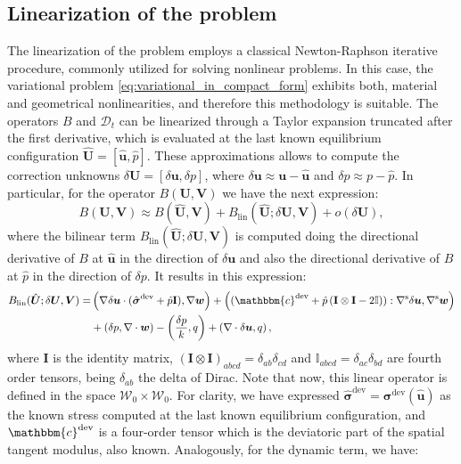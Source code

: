 \documentclass[11pt,english]{article}
\def\disp{\boldsymbol{u}}
\def\disptest{\boldsymbol{w}}
\def\stress{\boldsymbol{\sigma}}
\def\Identity{\mathbf{I}}
\def\SpaceTotal{\boldsymbol{\mathcal{W}}}
\def\TestFunctions{\boldsymbol{V}}
\def\UnkVariables{\boldsymbol{U}}
\def\DerB{B_{\text{lin}}}
\begin{document}
    \subsection{Linearization of the problem} \label{sec:linearization}
The linearization of the problem employs a classical Newton-Raphson iterative procedure, commonly utilized for solving nonlinear problems.  In this case, the variational problem \eqref{eq:variational_in_compact_form} exhibits both, material and geometrical nonlinearities, and therefore this methodology is suitable. The operators $B$ and $\mathcal{D}_t$ can be linearized through a Taylor expansion truncated after the first derivative, which is evaluated at the last known equilibrium configuration $\hat{\UnkVariables}=[\hat{\disp},\hat{p}]$.  These approximations allows to compute the correction unknowns $\delta \UnkVariables=[\delta\disp,\delta p]$, where $\delta\disp \approx \boldsymbol{u} - \hat{\disp}$ and $\delta p \approx p - \hat{p}$.  In particular, for the operator $B\left(\UnkVariables,\TestFunctions\right)$ we have the next expression:
    \begin{equation}
        B\left(\UnkVariables,\TestFunctions\right) \approx B(\hat{\UnkVariables},\TestFunctions) + \DerB(\hat{\UnkVariables};\delta \UnkVariables, \TestFunctions)  + o(\delta \UnkVariables), \label{eq:lin_bilinear}
    \end{equation}
where the bilinear term $\DerB(\hat{\UnkVariables}; \delta \UnkVariables, \TestFunctions)$ is computed doing the directional derivative of $B$ at $\hat{\boldsymbol{u}}$ in the direction of   $\delta \disp$ and also the directional derivative of $B$ at $\hat{p}$ in the direction of $\delta p$. It results in this expression:
    \begin{align*}
        \DerB(\hat{\UnkVariables}; \delta \UnkVariables, \TestFunctions)=& \left( \nabla \delta \disp \cdot (\hat{\stress}^{\text{dev}}+\hat{p}\Identity), \nabla \disptest \right) + \left(  (\mathbbm{c}^{\text{dev}}+\hat{p}\left( \Identity \otimes \Identity -2\mathbb{I})\right):\nabla^{\rm{s}} \delta \disp, \nabla^{\rm{s}} \disptest \right) \nonumber\\
        &+\left( \delta p ,\nabla \cdot \disptest \right) - \left( \dfrac{\delta p}{k}, q\right) + \left(\nabla \cdot \delta \disp, q\right),
    \end{align*}
where $\Identity$ is the identity matrix, $(\Identity \otimes \Identity)_{abcd}=\delta_{ab}\delta_{cd}$ and $\mathbb{I}_{abcd}=\delta_{ac}\delta_{bd}$ are fourth order tensors, being $\delta_{ab}$ the delta of Dirac. Note that now, this linear operator is defined in the space $\SpaceTotal_0\times\SpaceTotal_0$. For clarity, we have expressed $\hat{\stress}^{\text{dev}}=\stress^{\text{dev}}(\hat{\boldsymbol{u}})$ as the known stress computed at the last known equilibrium configuration, and  $\mathbbm{c}^{\text{dev}}$ is a four-order tensor which is the deviatoric part of the spatial tangent modulus, also known.  Analogously, for the dynamic term, we have: 
\end{document}
